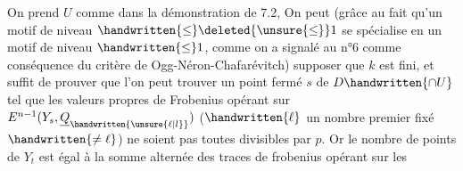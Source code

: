 On prend $U$ comme dans la démonstration de 7.2,  On peut (grâce au fait qu'un motif de niveau $\handwritten{\leq}\deleted{\unsure{\leq}}1$ se spécialise en un motif de niveau $\handwritten{\leq}1$, comme on a signalé au n°6 comme conséquence du critère de Ogg-Néron-Chafarévitch) supposer que $k$ est fini, et   suffit de prouver que l'on peut trouver un point fermé $s$ de $D\handwritten{\cap U}$ tel que les valeurs propres de Frobenius opérant sur $E^{n-1}(Y_s,\underline{Q}_{\handwritten{\unsure{\ell|l}}})$ ($\handwritten{\ell}$ un nombre premier fixé $\handwritten{\ne\ell}$) ne soient pas toutes divisibles par $p$. Or le nombre de points de $Y_t$ est égal à la somme alternée des traces de frobenius opérant sur les 
